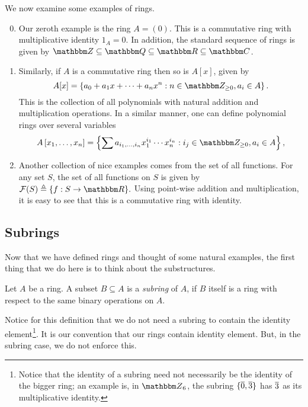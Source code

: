 \begin{example} We now examine some examples of rings.
\begin{enumerate}
    \setcounter{enumi}{-1}
    \item Our zeroth example is the ring $A=(0).$ This is a commutative ring with multiplicative identity $1_A = 0.$ In addition, the standard sequence of rings is given by ${\Z}\ss {\Q}\ss {\R}\ss {\C}$. 
    \item Similarly, if $A$ is a commutative ring then so is $A[x]$,
    given by
    \[A[x]=\left\{a_{0}+a_{1}x+\cdots+a_{n} x^{n}: n \in \Z_{\ge 0}, a_{i} \in A \right\}.\]
    This is the collection of all polynomials with natural addition and multiplication operations. In a similar manner, one can define polynomial rings over several variables
    \[ A\left[x_{1}, \ldots, x_{n}\right]=\left\{\sum a_{i_{1}, \ldots, i_{n}} x_{1}^{i_{1}} \cdots x_{n}^{i_{n}}: i_{j} \in \Z_{\ge 0}, a_{i} \in A\right\},    \]
    \item Another collection of nice examples comes from the set of all functions. For any set $S$, the set of all functions on $S$ is given by 
    \(\mathcal{F}(S)\triangleq\{f: S \rightarrow {\R}\}.\)
    Using point-wise addition and multiplication,
    it is easy to see that this is a commutative ring with identity. 
\end{enumerate}
\end{example}

\subsection{Subrings}
Now that we have defined rings and thought of some natural examples, the first thing that we do here is to think about the substructures. 

\begin{definition}[Subring]\label{def: subring}
    Let $A$ be a ring. A subset $B \subseteq A$ is a {\it subring} of $A$, if $B$ itself is a ring with respect to the same binary operations on $A$.
\end{definition}

Notice for this definition that we do not need a subring to contain the identity element\footnote{Notice that the identity of a subring need not necessarily be the identity of the bigger ring; an example is, in ${\Z}_{6}$, the subring $\{\overline{0}, \overline{3}\}$ has $\overline{3}$ as its multiplicative identity.}. It is our convention that our rings contain identity element. But, in the subring case, we do not enforce this. 

